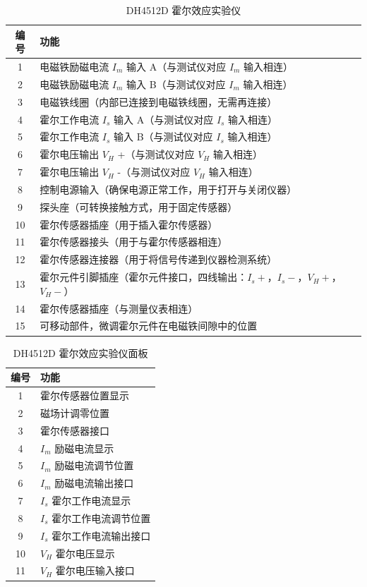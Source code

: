 \documentclass[a4paper,10pt]{article}
\begin{document}
\begin{table}[H]
\centering
\caption{DH4512D 霍尔效应实验仪}
\begin{tabular}{|c|l|}
\hline
\textbf{编号} & \textbf{功能} \\ \hline
1 & 电磁铁励磁电流 \(I_m\) 输入 A（与测试仪对应 \(I_m\) 输入相连） \\ \hline
2 & 电磁铁励磁电流 \(I_m\) 输入 B（与测试仪对应 \(I_m\) 输入相连） \\ \hline
3 & 电磁铁线圈（内部已连接到电磁铁线圈，无需再连接） \\ \hline
4 & 霍尔工作电流 \(I_s\) 输入 A（与测试仪对应 \(I_s\) 输入相连） \\ \hline
5 & 霍尔工作电流 \(I_s\) 输入 B（与测试仪对应 \(I_s\) 输入相连） \\ \hline
6 & 霍尔电压输出 \(V_H\) +（与测试仪对应 \(V_H\) 输入相连） \\ \hline
7 & 霍尔电压输出 \(V_H\) -（与测试仪对应 \(V_H\) 输入相连） \\ \hline
8 & 控制电源输入（确保电源正常工作，用于打开与关闭仪器） \\ \hline
9 & 探头座（可转换接触方式，用于固定传感器） \\ \hline
10 & 霍尔传感器插座（用于插入霍尔传感器） \\ \hline
11 & 霍尔传感器接头（用于与霍尔传感器相连） \\ \hline
12 & 霍尔传感器连接器（用于将信号传递到仪器检测系统） \\ \hline
13 & 霍尔元件引脚插座（霍尔元件接口，四线输出：\(I_s+\)，\(I_s-\)，\(V_H+\)，\(V_H-\)） \\ \hline
14 & 霍尔传感器插座（与测量仪表相连） \\ \hline
15 & 可移动部件，微调霍尔元件在电磁铁间隙中的位置 \\ \hline
\end{tabular}
\end{table}

\begin{table}[H]
\centering
\caption{DH4512D 霍尔效应实验仪面板}
\begin{tabular}{|c|l|}
\hline
\textbf{编号} & \textbf{功能} \\ \hline
1 & 霍尔传感器位置显示 \\ \hline
2 & 磁场计调零位置 \\ \hline
3 & 霍尔传感器接口 \\ \hline
4 & \(I_m\) 励磁电流显示 \\ \hline
5 & \(I_m\) 励磁电流调节位置 \\ \hline
6 & \(I_m\) 励磁电流输出接口 \\ \hline
7 & \(I_s\) 霍尔工作电流显示 \\ \hline
8 & \(I_s\) 霍尔工作电流调节位置 \\ \hline
9 & \(I_s\) 霍尔工作电流输出接口 \\ \hline
10 & \(V_H\) 霍尔电压显示 \\ \hline
11 & \(V_H\) 霍尔电压输入接口 \\ \hline
\end{tabular}
\end{table}
\end{document}
